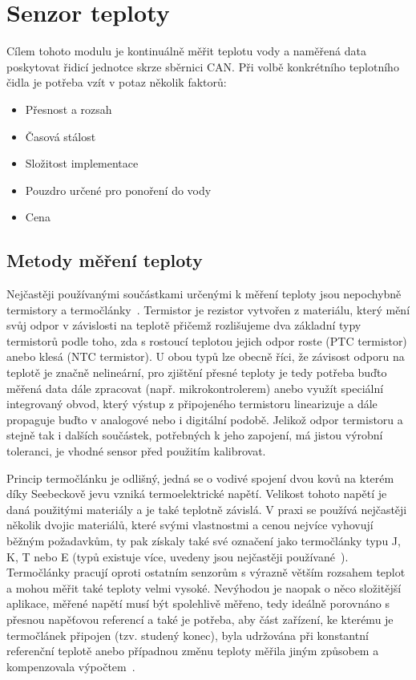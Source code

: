 \section{Senzor teploty}
\label{sec:perif-sensor-teploty}
    Cílem tohoto modulu je kontinuálně měřit teplotu vody a naměřená data poskytovat řidicí jednotce skrze sběrnici CAN. Při volbě konkrétního teplotního čidla je potřeba vzít v potaz několik faktorů:
    \begin{itemize}
        \item Přesnost a rozsah
        \item Časová stálost
        \item Složitost implementace 
        \item Pouzdro určené pro ponoření do vody
        \item Cena
    \end{itemize}

    \subsection{Metody měření teploty}
        Nejčastěji používanými součástkami určenými k měření teploty jsou nepochybně termistory a termočlánky~\cite{allaboutcircuits2023tempsensors}. Termistor je rezistor vytvořen z materiálu, který mění svůj odpor v závislosti na teplotě přičemž rozlišujeme dva základní typy termistorů podle toho, zda s rostoucí teplotou jejich odpor roste (PTC termistor) anebo klesá (NTC termistor). U obou typů lze obecně říci, že závisost odporu na teplotě je značně nelineární, pro zjištění přesné teploty je tedy potřeba buďto měřená data dále zpracovat (např. mikrokontrolerem) anebo využít speciální integrovaný obvod, který výstup z připojeného termistoru linearizuje a dále propaguje buďto v analogové nebo i digitální podobě. Jelikož odpor termistoru a stejně tak i dalších součástek, potřebných k jeho zapojení, má jistou výrobní toleranci, je vhodné sensor před použitím kalibrovat.

        Princip termočlánku je odlišný, jedná se o vodivé spojení dvou kovů na kterém díky Seebeckově jevu vzniká termoelektrické napětí. Velikost tohoto napětí je daná použitými materiály a je také teplotně závislá. V praxi se používá nejčastěji několik dvojic materiálů, které svými vlastnostmi a cenou nejvíce vyhovují běžným požadavkům, ty pak získaly také své označení jako termočlánky typu J, K, T nebo E (typů existuje více, uvedeny jsou nejčastěji používané~\cite{TechieScience_Thermocouples}). Termočlánky pracují oproti ostatním senzorům s výrazně větším rozsahem teplot a mohou měřit také teploty velmi vysoké. Nevýhodou je naopak o něco složitější aplikace, měřené napětí musí být spolehlivě měřeno, tedy ideálně porovnáno s přesnou napěťovou referencí a také je potřeba, aby část zařízení, ke kterému je termočlánek připojen (tzv. studený konec), byla udržována při konstantní referenční teplotě anebo případnou změnu teploty měřila jiným způsobem a kompenzovala výpočtem~\cite{allaboutcircuits2023tempsensors,TechieScience_Thermocouples}.

